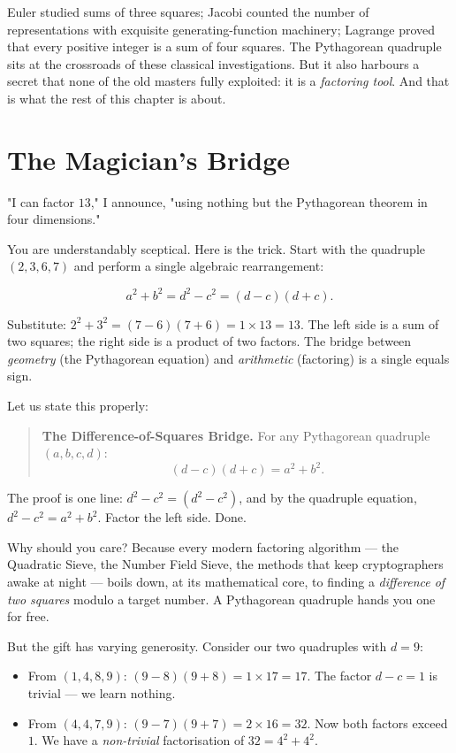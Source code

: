 \documentclass[11pt,twoside,openright]{book}
\theoremstyle{definition}
\theoremstyle{remark}
\begin{document}
Euler studied sums of three squares; Jacobi counted the number of representations with exquisite generating-function machinery; Lagrange proved that every positive integer is a sum of four squares. The Pythagorean quadruple sits at the crossroads of these classical investigations. But it also harbours a secret that none of the old masters fully exploited: it is a \textit{factoring tool}. And that is what the rest of this chapter is about.


\section{The Magician's Bridge}

"I can factor $13$," I announce, "using nothing but the Pythagorean theorem in four dimensions."

You are understandably sceptical. Here is the trick. Start with the quadruple $(2, 3, 6, 7)$ and perform a single algebraic rearrangement:

\[a^2 + b^2 = d^2 - c^2 = (d - c)(d + c).\]

Substitute: $2^2 + 3^2 = (7 - 6)(7 + 6) = 1 \times 13 = 13$. The left side is a sum of two squares; the right side is a product of two factors. The bridge between \textit{geometry} (the Pythagorean equation) and \textit{arithmetic} (factoring) is a single equals sign.

Let us state this properly:

\begin{quote}
\textbf{The Difference-of-Squares Bridge.} For any Pythagorean quadruple $(a, b, c, d)$:
$$(d - c)(d + c) = a^2 + b^2.$$
\end{quote}
The proof is one line: $d^2 - c^2 = (d^2 - c^2)$, and by the quadruple equation, $d^2 - c^2 = a^2 + b^2$. Factor the left side. Done.

Why should you care? Because every modern factoring algorithm --- the Quadratic Sieve, the Number Field Sieve, the methods that keep cryptographers awake at night --- boils down, at its mathematical core, to finding a \textit{difference of two squares} modulo a target number. A Pythagorean quadruple hands you one for free.

But the gift has varying generosity. Consider our two quadruples with $d = 9$:

\begin{itemize}
  \item From $(1, 4, 8, 9)$: $(9 - 8)(9 + 8) = 1 \times 17 = 17$. The factor $d - c = 1$ is trivial --- we learn nothing.
  \item From $(4, 4, 7, 9)$: $(9 - 7)(9 + 7) = 2 \times 16 = 32$. Now both factors exceed $1$. We have a \textit{non-trivial} factorisation of $32 = 4^2 + 4^2$.
\end{itemize}
\end{document}
